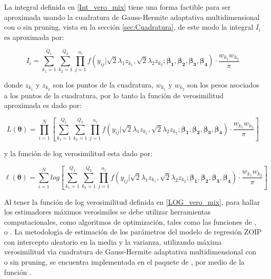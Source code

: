 La integral definida en \eqref{Int_vero_mix} tiene una forma factible para ser aproximada usando la cuadratura de Gauss-Hermite adaptativa multidimensional con o sin pruning, vista en la secci\'{o}n \ref{sec:Cuadratura}, de este modo la integral $I_i$ es aproximada por:

\[
I_i=\sum_{k_1=1}^{Q_1}{\sum_{k_2=1}^{Q_2}{\prod_{j=1}^{n_i}f(y_{ij}|\sqrt{2}\lambda_1 z_{k_1},\sqrt{2}\lambda_2 z_{k_2};\boldsymbol{\beta_1}, \boldsymbol{\beta_2}, \boldsymbol{\beta_3}, \boldsymbol{\beta_4})\cdot \frac{w_{k_1}w_{k_2}}{\pi}}}
\]

donde $z_{k_1}$ y $z_{k_2}$ son los puntos de la cuadratura, $w_{k_1}$ y $w_{k_2}$ son los pesos asociados a los puntos de la cuadratura, por lo tanto la funci\'{o}n de verosimilitud aproximada es dado por:

\[
L(\boldsymbol{\theta})=\prod_{i=1}^{N}{\left[\sum_{k_1=1}^{Q_1}{\sum_{k_2=1}^{Q_2}{\prod_{j=1}^{n_i}f(y_{ij}|\sqrt{2}\lambda_1 z_{k_1},\sqrt{2}\lambda_2 z_{k_2};\boldsymbol{\beta_1}, \boldsymbol{\beta_2}, \boldsymbol{\beta_3}, \boldsymbol{\beta_4})\cdot \frac{w_{k_1}w_{k_2}}{\pi}}}\right]}
\]

y la funci\'{o}n de log verosimilitud esta dado por:

\begin{equation}
\ell(\boldsymbol{\theta})=\sum_{i=1}^{N}log{\left[\sum_{k_1=1}^{Q_1}{\sum_{k_2=1}^{Q_2}{\prod_{j=1}^{n_i}f(y_{ij}|\sqrt{2}\lambda_1 z_{k_1},\sqrt{2}\lambda_2 z_{k_2};\boldsymbol{\beta_1}, \boldsymbol{\beta_2}, \boldsymbol{\beta_3}, \boldsymbol{\beta_4})\cdot \frac{w_{k_1}w_{k_2}}{\pi}}}\right]}
\label{LOG_vero_mix}
\end{equation}

Al tener la funci\'{o}n de log verosimilitud definida en \eqref{LOG_vero_mix}, para hallar los estimadores m\'{a}ximos veros\'{\i}miles se debe utilizar herramientas computacionales, como algoritmos de optimizaci\'{o}n, tales como las funciones de ,  o . La metodolog\'{\i}a de estimaci\'{o}n de los par\'{a}metros del modelo de regresi\'{o}n ZOIP con intercepto aleatorio en la media y la varianza, utilizando m\'{a}xima verosimilitud v\'{\i}a cuadratura de Gauss-Hermite adaptativa multidimensional con o sin pruning, se encuentra implementada en el paquete  de , por medio de la funci\'{o}n .


